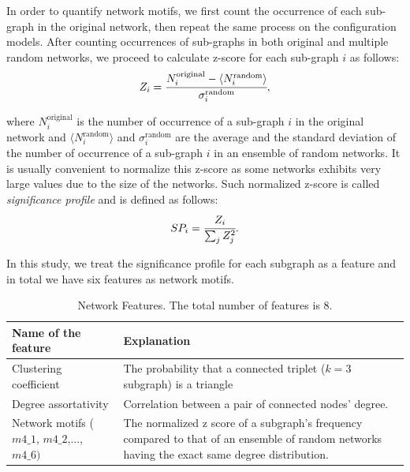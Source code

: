 \documentclass[..]{revtex4}
\begin{document}
In order to quantify network motifs, we first count the occurrence of each sub-graph in the original network, then repeat the same process on the configuration models. After counting occurrences of sub-graphs in both original and multiple random networks, we proceed to calculate z-score for each sub-graph $i$ as follows:
	\begin{equation}
	Z_i = \cfrac{N_i^{\text{original}} - \langle N_i^{\text{random}} \rangle }{\sigma_i^{\text{random}}},
	\end{equation}

where $N_i^{\text{original}}$ is the number of occurrence of a sub-graph $i$ in the original network and $ \langle N_i^{\text{random}} \rangle$ and $\sigma_i^{\text{random}}$ are the average and the standard deviation of the number of occurrence of a sub-graph $i$ in an ensemble of random networks. It is usually convenient to normalize this z-score as some networks exhibits very large values due to the size of the networks. Such normalized z-score is called \textit{significance profile} and is defined as follows:
	\begin{equation}
	SP_i = \cfrac{Z_i}{\sum_j Z_j^2}.
	\end{equation}
	
In this study, we treat the significance profile for each subgraph as a feature and in total we have six features as network motifs.
\newline



\begin{table}[htb]
  \begin{center}
    \caption{Network Features. The total number of features is $8$.}
    \begin{tabular}{| l | p{8cm} |} \hline
      Name of the feature & Explanation  \\ \hline \hline
      Clustering coefficient &  The probability that a connected triplet ($k=3$ subgraph) is a triangle \\  %
      Degree assortativity &  Correlation between a pair of connected nodes' degree. \\  %
      Network motifs ($m4\_1$, $m4\_2$,..., $m4\_6)$& The normalized z score of a subgraph's frequency compared to that of an ensemble of random networks having the exact same degree distribution. \\ \hline
    \end{tabular}
    \label{tab:feature}
  \end{center}
\end{table}
\end{document}

